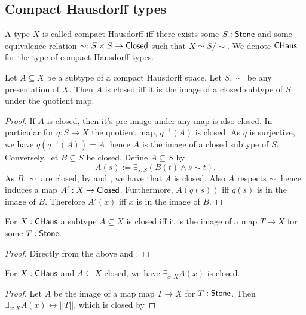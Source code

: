 \subsection{Compact Hausdorff types}
\begin{definition}
  A type $X$ is called compact Hausdorff iff there exists some $S:\mathsf{Stone}$ and some 
  equivalence relation $\sim:S \times S \to \mathsf{Closed}$ such that $X \simeq S / \sim$. 
  We denote $\mathsf{CHaus}$ for the type of compact Hausdorff types. 
\end{definition} 

\begin{lemma}
Let $A\subseteq X$ be a subtype of a compact Hausdorff space. 
Let $S, \sim$ be any presentation of $X$. 
Then $A$ is closed iff it is the image of a closed subtype of $S$ under the quotient map. 
\end{lemma}
\begin{proof}
  If $A$ is closed, then it's pre-image under any map is also closed. 
  In particular for $q:S\to X$ the quotient map, $q^{-1}(A)$ is closed. 
  As $q$ is surjective, we have $q(q^{-1}(A)) = A$,
  hence $A$ is the image of a closed subtype of $S$. 
  Conversely, let $B\subseteq S$ be closed. 
  Define $A\subseteq S$ by 
  $$A(s) := \exists_{s:S} (B(t) \wedge s \sim t).$$
  As $B, \sim$ are closed, by  and , 
  we have that $A$  is closed. 
  Also $A$ respects $\sim$, hence induces a map $A': X\to \mathsf{Closed}$.
  Furthermore, $A(q(s))$ iff $q(s)$ is in the image of $B$. 
  Therefore $A'(x)$ iff $x$ is in the image of $B$. 
\end{proof}
\begin{corollary}
  For $X:\mathsf{CHaus}$ a subtype $A\subseteq X$ is closed iff it is the image of 
  a map $T\to X$ for some $T:\mathsf{Stone}$. 
\end{corollary}
\begin{proof}
  Directly from the above and .
\end{proof}

\begin{corollary}\label{InhabitedClosedSubSpaceClosed}
  For $X:\mathsf{CHaus}$ and $A\subseteq X$ closed, we have 
  $\exists_{x:X} A(x)$ is closed. 
\end{corollary}
\begin{proof}
  Let $A$ be the image of a map map $T\to X$ for $T:\mathsf{Stone}$. 
  Then $\exists_{x:X} A(x) \leftrightarrow ||T||$, which is closed by 
\end{proof}


